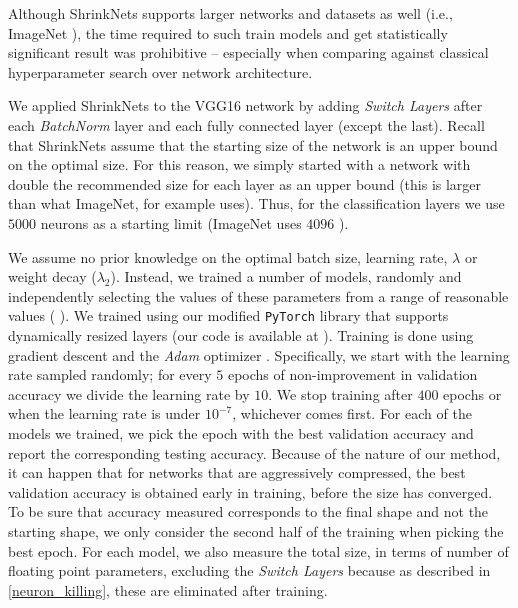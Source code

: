  Although ShrinkNets supports larger networks and datasets as well (i.e., ImageNet \cite{ILSVRC15}),  the time required to such train models and get statistically significant result was prohibitive -- especially when comparing against classical hyperparameter search over network architecture.  


We applied ShrinkNets to the VGG16 network by adding \textit{Switch Layers} after each
\textit{BatchNorm} layer and each fully connected layer (except the last).
Recall that ShrinkNets assume that the starting size of the network is an upper bound on the
optimal size. For this reason, we simply started with a network with double the recommended size for each
layer as an upper bound (this is larger than what ImageNet, for example uses). Thus, for the
classification layers we use $5000$ neurons as a starting limit (ImageNet
 uses $4096$ ).

We assume no prior knowledge on the optimal batch size, learning rate,
$\lambda$ or weight decay ($\lambda_2$). Instead, we trained a number of models,
 randomly and independently selecting the values of these parameters 
from a range of reasonable values ( ).
We trained using our modified \texttt{PyTorch} \cite{paszke2017automatic} library that
supports dynamically resized layers (our code is available at ). Training is done using gradient descent and the
 \textit{Adam} optimizer \cite{DBLP:journals/corr/KingmaB14}. Specifically, 
 we start with
the learning rate sampled randomly; for every $5$ epochs of non-improvement in
validation accuracy we divide the learning rate by $10$. We stop training after
$400$ epochs or when the learning rate is under $10^{-7}$, whichever comes
first.    
  For each of the models we trained, we pick the epoch with the best
validation accuracy and report the corresponding testing accuracy. Because of
the nature of our method, it can happen that for networks that are aggressively
compressed, the best validation accuracy is obtained early in  training,
before the size has converged. To be sure that accuracy measured corresponds to
the final shape and not the starting shape, we only consider the second half of
the training when picking the best epoch. For each model, we also measure the
total size, in terms of number of floating point parameters, excluding the
\textit{Switch Layers} because as described in \cref{neuron_killing}, these are eliminated
after training.

